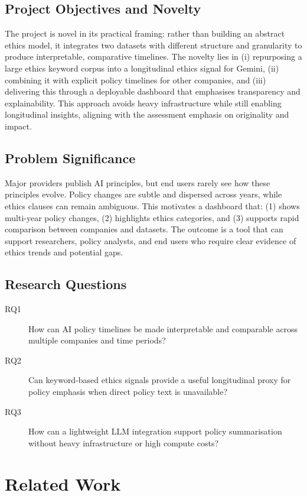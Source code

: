 \documentclass[conference]{IEEEtran}
\begin{document}
\subsection*{Project Objectives and Novelty}
The project is novel in its practical framing: rather than building an abstract
ethics model, it integrates two datasets with different structure and granularity
to produce interpretable, comparative timelines. The novelty lies in (i)
repurposing a large ethics keyword corpus into a longitudinal ethics signal for
Gemini, (ii) combining it with explicit policy timelines for other companies,
and (iii) delivering this through a deployable dashboard that emphasises
transparency and explainability. This approach avoids heavy infrastructure while
still enabling longitudinal insights, aligning with the assessment emphasis on
originality and impact.

\subsection*{Problem Significance}
Major providers publish AI principles, but end users rarely see how these
principles evolve. Policy changes are subtle and dispersed across years, while
ethics clauses can remain ambiguous. This motivates a dashboard that:
(1) shows multi-year policy changes, (2) highlights ethics categories, and
(3) supports rapid comparison between companies and datasets. The outcome is a
tool that can support researchers, policy analysts, and end users who require
clear evidence of ethics trends and potential gaps.

\subsection*{Research Questions}
\begin{description}
  \item[RQ1] How can AI policy timelines be made interpretable and comparable
    across multiple companies and time periods?
  \item[RQ2] Can keyword-based ethics signals provide a useful longitudinal
    proxy for policy emphasis when direct policy text is unavailable?
  \item[RQ3] How can a lightweight LLM integration support policy summarisation
    without heavy infrastructure or high compute costs?
\end{description}

\section{Related Work}
\end{document}
